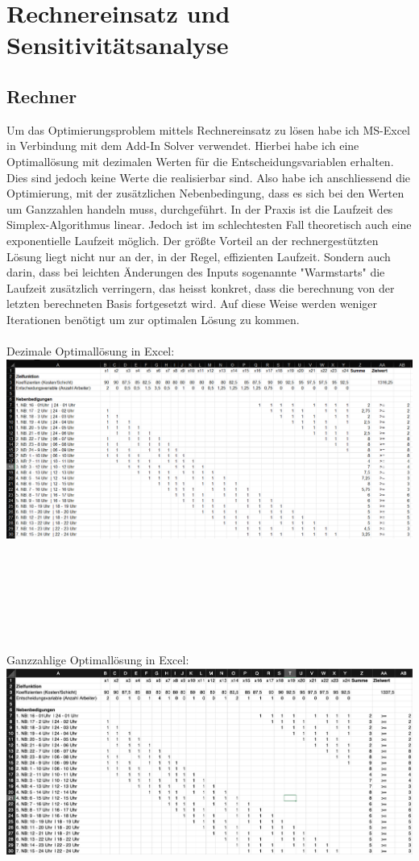 \section{Rechnereinsatz und Sensitivitätsanalyse}
\subsection{Rechner}
Um das Optimierungsproblem mittels Rechnereinsatz zu lösen habe ich MS-Excel in Verbindung mit dem Add-In Solver verwendet. Hierbei habe ich eine Optimallösung mit dezimalen Werten für die Entscheidungsvariablen erhalten. Dies sind jedoch keine Werte die realisierbar sind. Also habe ich anschliessend die Optimierung, mit der zusätzlichen Nebenbedingung, dass es sich bei den Werten um Ganzzahlen handeln muss, durchgeführt.
In der Praxis ist die Laufzeit des Simplex-Algorithmus linear. Jedoch ist im schlechtesten Fall theoretisch auch eine exponentielle Laufzeit möglich.
Der größte Vorteil an der rechnergestützten Lösung liegt nicht nur an der, in der Regel, effizienten Laufzeit. Sondern auch darin, dass bei leichten Änderungen des Inputs sogenannte "Warmstarts" die Laufzeit zusätzlich verringern, das heisst konkret, dass die berechnung von der letzten berechneten Basis fortgesetzt wird. Auf diese Weise werden weniger Iterationen benötigt um zur optimalen Lösung zu kommen.
\pagebreak
\\\\
Dezimale Optimallösung in Excel:\\
\includegraphics[width=17cm,left]{images/Excel_dezimal.png}\\\\
\\\\
\\\\
\\\\
Ganzzahlige Optimallösung in Excel:\\
\includegraphics[width=17cm,left]{images/Excel_Ganzzahl.png}\\\\
\pagebreak
